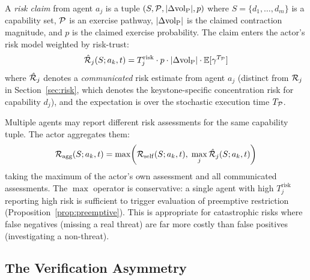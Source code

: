 \begin{definition}
\label{def:risk_claim}
A \emph{risk claim} from agent $a_j$ is a tuple $(S, \mathcal{P}, |\Delta
    {\operatorname{vol}_{\mathrm{P}}}|, p)$ where $S = \{d_1, \ldots, d_m\}$ is a capability set,
    $\mathcal{P}$ is an exercise pathway, $|\Delta {\operatorname{vol}_{\mathrm{P}}}|$ is the claimed
    contraction magnitude, and $p$ is the claimed exercise probability. The
    claim enters the actor's risk model weighted by risk-trust:
\begin{equation}
\label{eq:risk_claim_weight}
\hat{\mathcal{R}}_j(S; a_k, t) = T_j^{\mathrm{risk}} \cdot p \cdot |\Delta {\operatorname{vol}_{\mathrm{P}}}|
    \cdot \mathbb{E}[\gamma^{T_{\mathcal{P}}}]
\end{equation}
where $\hat{\mathcal{R}}_j$ denotes a \emph{communicated} risk estimate from
    agent $a_j$ (distinct from $\mathcal{R}_j$ in Section~\ref{sec:risk}, which
    denotes the keystone-specific concentration risk for capability $d_j$),
    and the expectation is over the stochastic execution time $T_{\mathcal{P}}$.
\end{definition}

Multiple agents may report different risk assessments for the same
capability tuple. The actor aggregates them:
\begin{equation}
\label{eq:risk_aggregate}
\mathcal{R}_{\mathrm{agg}}(S; a_k, t) = \max\!\left(
    \mathcal{R}_{\mathrm{self}}(S; a_k, t),\;
    \max_j \hat{\mathcal{R}}_j(S; a_k, t)
\right)
\end{equation}
taking the maximum of the actor's own assessment and all communicated
assessments. The $\max$ operator is conservative: a single agent with high
$T_j^{\mathrm{risk}}$ reporting high risk is sufficient to trigger
evaluation of preemptive restriction
(Proposition~\ref{prop:preemptive}). This is appropriate for
catastrophic risks where false negatives (missing a real threat) are far
more costly than false positives (investigating a non-threat).

\subsection{The Verification Asymmetry}

